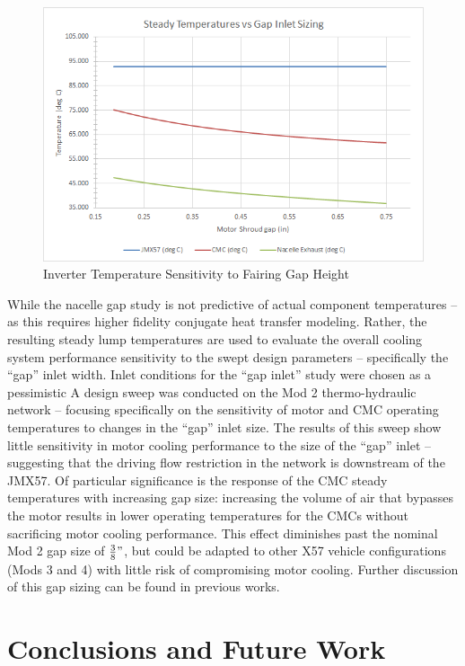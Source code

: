 \documentclass[]{aiaa-tc}%
\begin{document}
\begin{figure}[!htb]%
	\centering
	\includegraphics[width=.75\textwidth]{figures/gapsweep_results.png}
	\caption{Inverter Temperature Sensitivity to Fairing Gap Height}
	\label{fig:GapSweep}
\end{figure}

While the nacelle gap study is not predictive of actual component temperatures – as this requires higher fidelity conjugate heat transfer modeling.  Rather, the resulting steady lump temperatures are used to evaluate the overall cooling system performance sensitivity to the swept design parameters – specifically the “gap” inlet width.  Inlet conditions for the “gap inlet” study were chosen as a pessimistic  
A design sweep was conducted on the Mod 2 thermo-hydraulic network – focusing specifically on the sensitivity of motor and CMC operating temperatures to changes in the “gap” inlet size.  
The results of this sweep show little sensitivity in motor cooling performance to the size of the “gap” inlet – suggesting that the driving flow restriction in the network is downstream of the JMX57.  Of particular significance is the response of the CMC steady temperatures with increasing gap size:  increasing the volume of air that bypasses the motor results in lower operating temperatures for the CMCs without sacrificing motor cooling performance.  This effect diminishes past the nominal Mod 2 gap size of $\frac{3}{8}"$, but could be adapted to other X57 vehicle configurations (Mods 3 and 4) with little risk of compromising motor cooling. Further discussion of this gap sizing can be found in previous works. \cite{Schnulo}


\section{Conclusions and Future Work}
\end{document}
